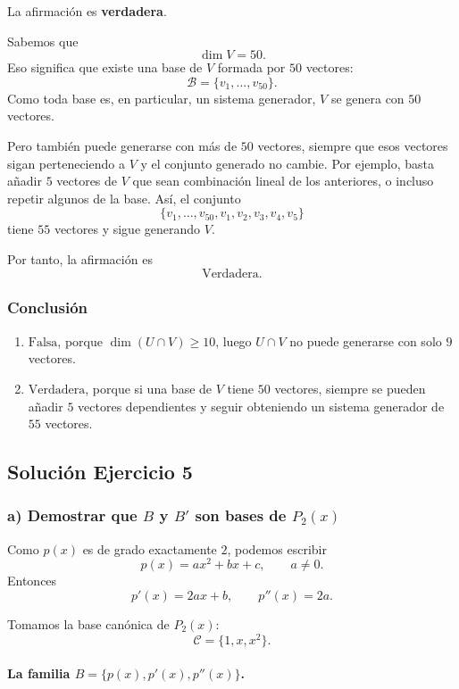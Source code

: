 \documentclass[12pt]{article}
\begin{document}
La afirmación es \textbf{verdadera}.

Sabemos que
\[
\dim V=50.
\]
Eso significa que existe una base de \(V\) formada por \(50\) vectores:
\[
\mathcal{B}=\{v_1,\dots,v_{50}\}.
\]
Como toda base es, en particular, un sistema generador, \(V\) se genera con \(50\) vectores.

Pero también puede generarse con más de \(50\) vectores, siempre que esos vectores sigan perteneciendo a \(V\) y el conjunto generado no cambie. Por ejemplo, basta añadir \(5\) vectores de \(V\) que sean combinación lineal de los anteriores, o incluso repetir algunos de la base. Así, el conjunto
\[
\{v_1,\dots,v_{50},v_1,v_2,v_3,v_4,v_5\}
\]
tiene \(55\) vectores y sigue generando \(V\).

Por tanto, la afirmación es
\[
\boxed{\text{Verdadera}.}
\]

\subsubsection*{Conclusión}

\begin{enumerate}
    \item \(\boxed{\text{Falsa}}\), porque \(\dim(U\cap V)\geq 10\), luego \(U\cap V\) no puede generarse con solo \(9\) vectores.
    \item \(\boxed{\text{Verdadera}}\), porque si una base de \(V\) tiene \(50\) vectores, siempre se pueden añadir \(5\) vectores dependientes y seguir obteniendo un sistema generador de \(55\) vectores.
\end{enumerate}

\subsection*{Solución Ejercicio 5}

\subsubsection*{a) Demostrar que \(B\) y \(B'\) son bases de \(P_2(x)\)}

Como \(p(x)\) es de grado exactamente \(2\), podemos escribir
\[
p(x)=ax^2+bx+c,
\qquad a\neq 0.
\]
Entonces
\[
p'(x)=2ax+b,
\qquad
p''(x)=2a.
\]

Tomamos la base canónica de \(P_2(x)\):
\[
\mathcal{C}=\{1,x,x^2\}.
\]

\paragraph{La familia \(B=\{p(x),p'(x),p''(x)\}\).}
\end{document}
